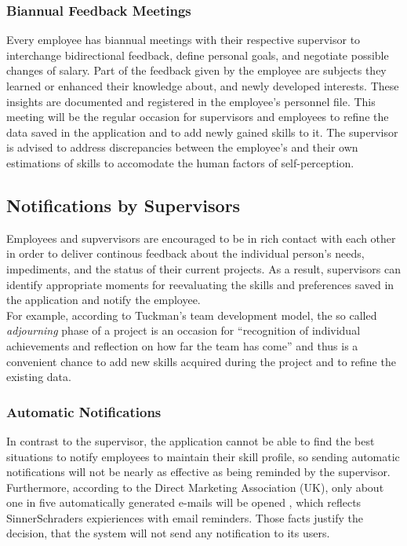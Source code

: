 \subsubsection{Biannual Feedback Meetings}
Every employee has biannual meetings with their respective supervisor to interchange
bidirectional feedback, define personal goals, and negotiate possible changes of salary.
Part of the feedback given by the employee are subjects they learned or enhanced their knowledge about, and newly developed interests. These insights are documented and registered in the employee's personnel file.
This meeting will be the regular occasion for supervisors and employees to refine the data saved in the application and to add
newly gained skills to it. The supervisor is advised to address discrepancies between the employee's and their own estimations of skills to accomodate the human factors of self-perception.

\subsection{Notifications by Supervisors}
Employees and supvervisors are encouraged to be in rich contact with each other in order to deliver continous feedback
about the individual person's needs, impediments, and the status of their current projects.
As a result, supervisors can identify appropriate moments for reevaluating the skills and preferences saved in the application and notify the employee.\\
For example, according to Tuckman's team development model, the so called \textit{adjourning} phase of a project is an occasion for ``recognition of individual achievements and reflection on how far the team has come'' \cite[P. 3]{Wilson} and thus is a convenient chance to add new skills acquired during the project and to refine the existing data.

\subsubsection{Automatic Notifications}
In contrast to the supervisor, the application cannot be able to find the best situations to notify employees to maintain their skill profile, so sending automatic notifications will not be nearly as effective as being reminded by the supervisor. Furthermore, according to the Direct Marketing Association (UK), only
about one in five automatically generated e-mails will be opened \cite{mailrep}, which reflects SinnerSchraders
expieriences with email reminders. Those facts justify the decision, that the system will not send any notification to its users.

